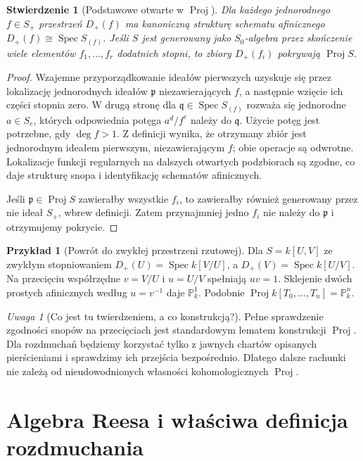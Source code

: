 \documentclass[11pt,a4paper,openany]{report}
\numberwithin{equation}{section}
\theoremstyle{plain}
\newtheorem{stwierdzenie}[twierdzenie]{Stwierdzenie}
\theoremstyle{definition}
\newtheorem{przyklad}[twierdzenie]{Przykład}
\theoremstyle{remark}
\newtheorem{uwaga}[twierdzenie]{Uwaga}
\newcommand{\PP}{\mathbb P}
\newcommand{\Spec}{\operatorname{Spec}}
\begin{document}
\begin{stwierdzenie}[Podstawowe otwarte w $\operatorname{Proj}$]
\label{st:ga5-proj-charts}
Dla każdego jednorodnego $f\in S_+$ przestrzeń $D_+(f)$
ma kanoniczną strukturę schematu afinicznego
$D_+(f)\cong\Spec S_{(f)}$. Jeśli $S$ jest generowany
jako $S_0$-algebra przez skończenie wiele elementów
$f_1,\ldots,f_r$ dodatnich stopni, to zbiory $D_+(f_i)$
pokrywają $\operatorname{Proj}S$.
\end{stwierdzenie}
\begin{proof}
Wzajemne przyporządkowanie ideałów pierwszych uzyskuje się
przez lokalizację jednorodnych ideałów $\mathfrak p$
niezawierających $f$, a następnie wzięcie ich części
stopnia zero. W drugą stronę dla
$\mathfrak q\in\Spec S_{(f)}$ rozważa się jednorodne
$a\in S_e$, których odpowiednia potęga $a^d/f^e$
należy do $\mathfrak q$. Użycie potęg jest potrzebne,
gdy $\deg f>1$. Z definicji wynika, że otrzymany zbiór
jest jednorodnym ideałem pierwszym, niezawierającym $f$;
obie operacje są odwrotne. Lokalizacje funkcji regularnych
na dalszych otwartych podzbiorach są zgodne, co daje
strukturę snopa i identyfikację schematów afinicznych.

Jeśli $\mathfrak p\in\operatorname{Proj}S$ zawierałby
wszystkie $f_i$, to zawierałby również generowany
przez nie ideał $S_+$, wbrew definicji. Zatem
przynajmniej jedno $f_i$ nie należy do $\mathfrak p$
i otrzymujemy pokrycie.
\end{proof}

\begin{przyklad}[Powrót do zwykłej przestrzeni rzutowej]
Dla $S=k[U,V]$ ze zwykłym stopniowaniem
$D_+(U)=\Spec k[V/U]$, a $D_+(V)=\Spec k[U/V]$.
Na przecięciu współrzędne $v=V/U$ i $u=U/V$
spełniają $uv=1$. Sklejenie dwóch prostych afinicznych
według $u=v^{-1}$ daje $\PP^1_k$.
Podobnie $\operatorname{Proj}k[T_0,\ldots,T_n]=\PP^n_k$.
\end{przyklad}

\begin{uwaga}[Co jest tu twierdzeniem, a co konstrukcją?]
Pełne sprawdzenie zgodności snopów na przecięciach jest
standardowym lematem konstrukcji $\operatorname{Proj}$.
Dla rozdmuchań będziemy korzystać tylko z jawnych chartów
opisanych pierścieniami i sprawdzimy ich przejścia bezpośrednio.
Dlatego dalsze rachunki nie zależą od nieudowodnionych
własności kohomologicznych $\operatorname{Proj}$.
\end{uwaga}

\section{Algebra Reesa i właściwa definicja rozdmuchania}
\label{sec:ga5-rees}
\end{document}
